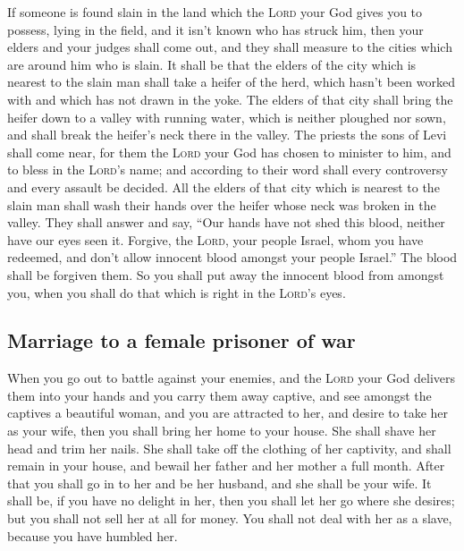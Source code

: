 If someone is found slain in the land which the
\textsc{Lord} your God gives you to possess, lying in the field, and it
isn't known who has struck him,  then your elders and your
judges shall come out, and they shall measure to the cities which are
around him who is slain.  It shall be that the elders of
the city which is nearest to the slain man shall take a heifer of the
herd, which hasn't been worked with and which has not drawn in the yoke.
 The elders of that city shall bring the heifer down to a
valley with running water, which is neither ploughed nor sown, and shall
break the heifer's neck there in the valley.  The priests
the sons of Levi shall come near, for them the \textsc{Lord} your God
has chosen to minister to him, and to bless in the \textsc{Lord}'s name;
and according to their word shall every controversy and every assault be
decided.  All the elders of that city which is nearest to
the slain man shall wash their hands over the heifer whose neck was
broken in the valley.  They shall answer and say, ``Our
hands have not shed this blood, neither have our eyes seen it.
 Forgive, the \textsc{Lord}, your people Israel, whom you
have redeemed, and don't allow innocent blood amongst your people
Israel.'' The blood shall be forgiven them.  So you shall
put away the innocent blood from amongst you, when you shall do that
which is right in the \textsc{Lord}'s eyes.

\hypertarget{marriage-to-a-female-prisoner-of-war}{%
\subsection{Marriage to a female prisoner of
war}\label{marriage-to-a-female-prisoner-of-war}}

 When you go out to battle against your enemies, and the
\textsc{Lord} your God delivers them into your hands and you carry them
away captive,  and see amongst the captives a beautiful
woman, and you are attracted to her, and desire to take her as your
wife,  then you shall bring her home to your house. She
shall shave her head and trim her nails.  She shall take
off the clothing of her captivity, and shall remain in your house, and
bewail her father and her mother a full month. After that you shall go
in to her and be her husband, and she shall be your wife.
 It shall be, if you have no delight in her, then you
shall let her go where she desires; but you shall not sell her at all
for money. You shall not deal with her as a slave, because you have
humbled her.

